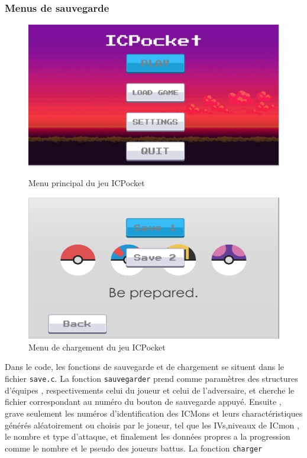 \documentclass[12pt,a4paper, twoside]{article}
\begin{document}
     \subsubsection{Menus de sauvegarde}
     \begin{figure}[h!]
        \centering
        \begin{minipage}[t]{0.48\textwidth}
            \centering
            \includegraphics[width=\textwidth]{menuicmonp.png}
            \caption{Menu principal du jeu ICPocket}
            \label{fig:menuicmonp}
        \end{minipage}
        \hfill
        \begin{minipage}[t]{0.48\textwidth}
            \centering
            \includegraphics[width=\textwidth]{menuload.png}
            \caption{Menu de chargement du jeu ICPocket}
            \label{fig:menuload}
        \end{minipage}
    \end{figure}
    Dans le code, les fonctions de sauvegarde et de chargement se situent dans le fichier \texttt{save.c}. La fonction \texttt{sauvegarder} prend comme paramètres des structures d'équipes , respectivements celui du joueur et celui de l'adversaire,
    et cherche le fichier correspondant au numéro du bouton de sauvegarde appuyé. Ensuite , grave seulement les numéros d'identification des ICMons et leurs charactéristiques générés aléatoirement ou choisis par le joueur, tel que les IVs,niveaux de ICmon , le nombre et type d'attaque, et finalement les données propres a la progression
    comme le nombre et le pseudo des joueurs battus.
    La fonction \texttt{charger}
\end{document}
